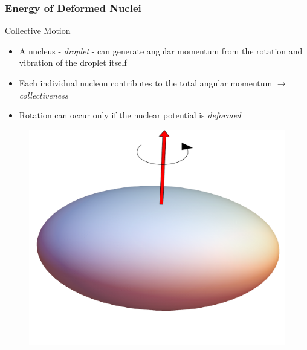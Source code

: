\documentclass{beamer}
\begin{document}
\begin{frame}
  \frametitle{Energy of Deformed Nuclei}
    \begin{block}{Collective Motion}
      \begin{itemize}
        \item A nucleus - \emph{droplet} - can generate angular momentum from the rotation and vibration of the droplet itself
        \item Each individual nucleon contributes to the total angular momentum $\rightarrow$ \emph{collectiveness}
        \item \faWarning Rotation can occur only if the nuclear potential is \emph{deformed}
      \end{itemize}
    \end{block}
    \begin{figure}
      \centering
      \includegraphics[scale=0.22]{Figs/collective-rotation.pdf}
    \end{figure}
\end{frame}
\end{document}
